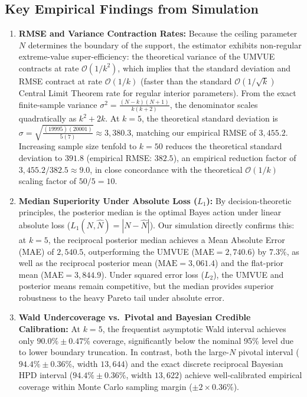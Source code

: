 \documentclass[10pt,a4paper]{article}
\begin{document}
\subsection{Key Empirical Findings from Simulation}
\begin{enumerate}
    \item \textbf{RMSE and Variance Contraction Rates:} Because the ceiling parameter $N$ determines the boundary of the support, the estimator exhibits non-regular extreme-value super-efficiency: the theoretical variance of the UMVUE contracts at rate $\mathcal{O}(1/k^2)$, which implies that the standard deviation and RMSE contract at rate $\mathcal{O}(1/k)$ (faster than the standard $\mathcal{O}(1/\sqrt{k})$ Central Limit Theorem rate for regular interior parameters). From the exact finite-sample variance $\sigma^2 = \frac{(N-k)(N+1)}{k(k+2)}$, the denominator scales quadratically as $k^2 + 2k$. At $k = 5$, the theoretical standard deviation is $\sigma = \sqrt{\frac{(19995)(20001)}{5(7)}} \approx 3,380.3$, matching our empirical RMSE of $3,455.2$. Increasing sample size tenfold to $k = 50$ reduces the theoretical standard deviation to $391.8$ (empirical RMSE: $382.5$), an empirical reduction factor of $3,455.2 / 382.5 \approx 9.0$, in close concordance with the theoretical $\mathcal{O}(1/k)$ scaling factor of $50 / 5 = 10$.
    \item \textbf{Median Superiority Under Absolute Loss ($L_1$):} By decision-theoretic principles, the posterior median is the optimal Bayes action under linear absolute loss ($L_1(N, \hat{N}) = |N - \hat{N}|$). Our simulation directly confirms this: at $k = 5$, the reciprocal posterior median achieves a Mean Absolute Error (MAE) of $2,540.5$, outperforming the UMVUE ($\text{MAE} = 2,740.6$) by $7.3\%$, as well as the reciprocal posterior mean ($\text{MAE} = 3,061.4$) and the flat-prior mean ($\text{MAE} = 3,844.9$). Under squared error loss ($L_2$), the UMVUE and posterior means remain competitive, but the median provides superior robustness to the heavy Pareto tail under absolute error.
    \item \textbf{Wald Undercoverage vs.\ Pivotal and Bayesian Credible Calibration:} At $k = 5$, the frequentist asymptotic Wald interval achieves only $90.0\% \pm 0.47\%$ coverage, significantly below the nominal 95\% level due to lower boundary truncation. In contrast, both the large-$N$ pivotal interval ($94.4\% \pm 0.36\%$, width $13,644$) and the exact discrete reciprocal Bayesian HPD interval ($94.4\% \pm 0.36\%$, width $13,622$) achieve well-calibrated empirical coverage within Monte Carlo sampling margin ($\pm 2 \times 0.36\%$).
\end{enumerate}
\end{document}

